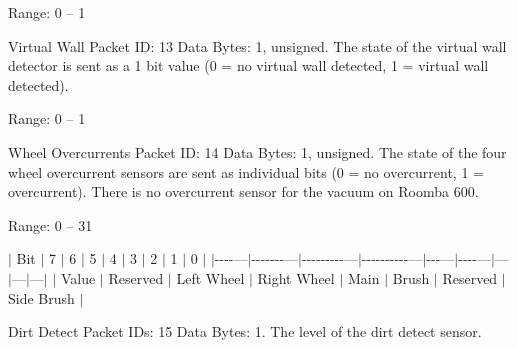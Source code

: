 \begin{Desc}
\begin{description}
Range\+: 0 – 1 \item[{\em 
\hypertarget{group__roomba-lib_gga46f008b5055c4a08d3123c6a3478373ea77bf37294b6048b213bd8b323f10d7d9}{}R\+O\+O\+M\+B\+A\+\_\+\+V\+I\+R\+T\+U\+A\+L\+\_\+\+W\+A\+L\+L\label{group__roomba-lib_gga46f008b5055c4a08d3123c6a3478373ea77bf37294b6048b213bd8b323f10d7d9}
}]Virtual Wall Packet I\+D\+: 13 Data Bytes\+: 1, unsigned. The state of the virtual wall detector is sent as a 1 bit value (0 = no virtual wall detected, 1 = virtual wall detected).

Range\+: 0 – 1 \item[{\em 
\hypertarget{group__roomba-lib_gga46f008b5055c4a08d3123c6a3478373eaacff57f6cfe6ccf34a80de88efee8ad9}{}R\+O\+O\+M\+B\+A\+\_\+\+O\+V\+E\+R\+C\+U\+R\+R\+E\+N\+T\+S\label{group__roomba-lib_gga46f008b5055c4a08d3123c6a3478373eaacff57f6cfe6ccf34a80de88efee8ad9}
}]Wheel Overcurrents Packet I\+D\+: 14 Data Bytes\+: 1, unsigned. The state of the four wheel overcurrent sensors are sent as individual bits (0 = no overcurrent, 1 = overcurrent). There is no overcurrent sensor for the vacuum on Roomba 600.

Range\+: 0 – 31

$\vert$ Bit $\vert$ 7 $\vert$ 6 $\vert$ 5 $\vert$ 4 $\vert$ 3 $\vert$ 2 $\vert$ 1 $\vert$ 0 $\vert$ $\vert$-\/-\/-\/-\/---$\vert$-\/-\/-\/-\/-\/-\/-\/---$\vert$-\/-\/-\/-\/-\/-\/-\/-\/-\/---$\vert$-\/-\/-\/-\/-\/-\/-\/-\/-\/-\/---$\vert$-\/-\/-\/---$\vert$-\/-\/-\/-\/---$\vert$---$\vert$---$\vert$---$\vert$ $\vert$ Value $\vert$ Reserved $\vert$ Left Wheel $\vert$ Right Wheel $\vert$ Main $\vert$ Brush $\vert$ Reserved $\vert$ Side Brush $\vert$ \item[{\em 
\hypertarget{group__roomba-lib_gga46f008b5055c4a08d3123c6a3478373ea9c217151461c8bf797485ad78f1a62cb}{}R\+O\+O\+M\+B\+A\+\_\+\+D\+I\+R\+T\+\_\+\+D\+E\+T\+E\+C\+T\label{group__roomba-lib_gga46f008b5055c4a08d3123c6a3478373ea9c217151461c8bf797485ad78f1a62cb}
}]Dirt Detect Packet I\+Ds\+: 15 Data Bytes\+: 1. The level of the dirt detect sensor.


\end{description}
\end{Desc}
